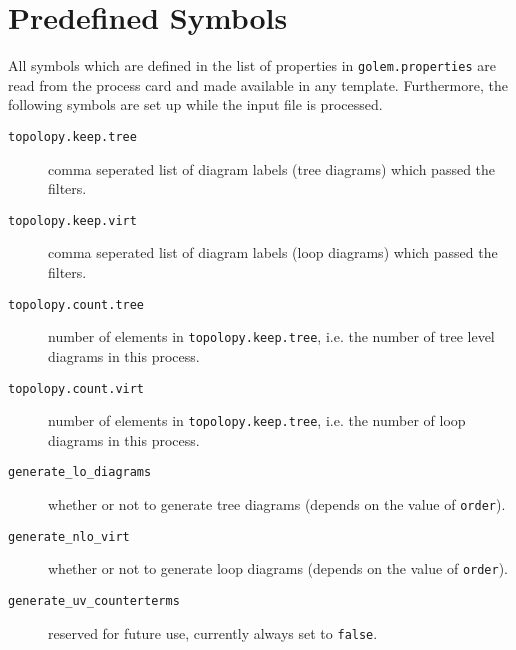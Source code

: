 \documentclass[11pt,a4paper]{refrep}
\begin{document}
\section{Predefined Symbols}
All symbols which are defined in the list of properties
in \texttt{golem.properties} are read from the process card and
made available in any template. Furthermore, the following symbols
are set up while the input file is processed.
\begin{description}
\item[\texttt{topolopy.keep.tree}] comma seperated list of diagram labels
(tree diagrams) which passed the filters.
\item[\texttt{topolopy.keep.virt}] comma seperated list of diagram labels
(loop diagrams) which passed the filters.
\item[\texttt{topolopy.count.tree}] number of elements in
\texttt{topolopy.keep.tree}, i.e. the number of tree level diagrams in this
process.
\item[\texttt{topolopy.count.virt}] number of elements in
\texttt{topolopy.keep.tree}, i.e. the number of loop diagrams in this
process.
\item[\texttt{generate\_lo\_diagrams}] whether or not to generate tree
diagrams (depends on the value of \texttt{order}).
\item[\texttt{generate\_nlo\_virt}] whether or not to generate loop
diagrams (depends on the value of \texttt{order}).
\item[\texttt{generate\_uv\_counterterms}] reserved for future use,
currently always set to \texttt{false}.
\end{description}
\bigskip
\end{document}
